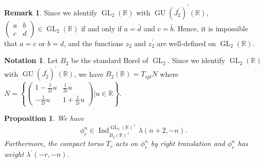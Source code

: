 \documentclass[11pt, a4paper]{amsart}
\theoremstyle{plain}
\newtheorem{proposition}[theorem]{Proposition}
\theoremstyle{definition}
\newtheorem{remark}[theorem]{Remark}
\newtheorem{notation}[theorem]{Notation}
\numberwithin{equation}{section}
\def\RR{\mathbb{R}}
\DeclareMathOperator{\GU}{GU}
\DeclareMathOperator{\Ind}{Ind}
\DeclareMathOperator{\GL}{\mathrm{GL}}
\begin{document}
\begin{remark}
    Since we identify $\GL_2(\RR)$ with $\GU(J_2^{\prime})^{\prime}(\RR)$,                                                                                                       $\begin{pmatrix}
                                                             a & b \\
                                                             c & d 
                                                            \end{pmatrix} \in \GL_2(\RR)$ if and only if $a = \bar{d}$ and $c = \bar{b}$. Hence, it is impossible that $a = c$ or $b = d$, and the functions $z_2$ and $z_2^{\prime}$ are well-defined on $\GL_{2}(\RR)$. 
\end{remark}

\begin{notation}
    Let $B_2$ be the standard Borel of $\GL_2$. Since we identify $\GL_{2}(\RR)$ with $\GU(J_2^{\prime})^{\prime}(\RR)$, we have 
    $B_{2}(\RR) = T_{spl} N$ where $N = \left\{ \begin{pmatrix} 
                                             1 - \frac{1}{2i}u & \frac{1}{2i}u \\
                                             -\frac{1}{2i}u & 1 + \frac{1}{2i}u 
                                            \end{pmatrix} | u \in \RR \right \}$. 
\end{notation}

\begin{proposition}
\label{prop: phi equivariant}
    We have 
    \begin{equation*}
        \phi_{r}^{n} \in \Ind_{B_{2}(\RR)^{+}}^{\GL_2(\RR)^{+}} \lambda(n + 2, -n). 
    \end{equation*}
   Furthermore, the compact torus $T_c$ acts on $\phi_{r}^{n}$ by right translation and $\phi_{r}^{n}$ has weight $\lambda^{\prime}(-r,-n)$. 
\end{proposition}
\end{document}

